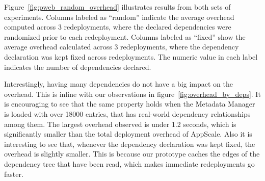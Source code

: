 Figure~\ref{fig:pweb_random_overhead} illustrates results from both sets of experiments. Columns labeled as ``random'' indicate the average overhead
computed across 3 redeployments, where the declared dependencies were randomized prior to each redeployment. Columns labeled as ``fixed'' show
the average overhead calculated across 3 redeployments, where the dependency declaration was kept fixed across redeployments. The numeric value
in each label indicates the number of dependencies declared.

Interestingly, having many dependencies do not have a big impact on the overhead. This is inline with our observations in figure~\ref{fig:overhead_by_deps}.
It is encouraging to see that the same property holds when the Metadata Manager is loaded with over 18000 entries, that has real-world dependency
relationships among them. The largest overhead observed is under 1.2 seconds, which is significantly smaller than the total deployment overhead of AppScale.
Also it is interesting to see that, whenever the dependency declaration was kept fixed, the overhead is slightly smaller. This is because our prototype caches
the edges of the dependency tree that have been read, which makes immediate redeployments go faster.